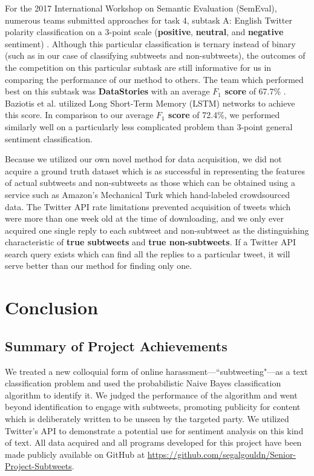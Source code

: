 \documentclass[11pt, twoside, reqno]{book}
\begin{document}
For the 2017 International Workshop on Semantic Evaluation (SemEval), numerous teams submitted approaches for task 4, subtask A: English Twitter polarity classification on a 3-point scale (\textbf{positive}, \textbf{neutral}, and \textbf{negative} sentiment) \cite{semeval_2017}. Although this particular classification is ternary instead of binary (such as in our case of classifying subtweets and non-subtweets), the outcomes of the competition on this particular subtask are still informative for us in comparing the performance of our method to others. The team which performed best on this subtask was \textbf{DataStories} with an average \textbf{$F_{1}$ score} of 67.7\% \cite{semeval_best}. Baziotis et al. utilized Long Short-Term Memory (LSTM) networks to achieve this score. In comparison to our average \textbf{$F_{1}$ score} of 72.4\%, we performed similarly well on a particularly less complicated problem than 3-point general sentiment classification.

Because we utilized our own novel method for data acquisition, we did not acquire a ground truth dataset which is as successful in representing the features of actual subtweets and non-subtweets as those which can be obtained using a service such as Amazon's Mechanical Turk which hand-labeled crowdsourced data. The Twitter API rate limitations prevented acquisition of tweets which were more than one week old at the time of downloading, and we only ever acquired one single reply to each subtweet and non-subtweet as the distinguishing characteristic of \textbf{true subtweets} and \textbf{true non-subtweets}. If a Twitter API search query exists which can find all the replies to a particular tweet, it will serve better than our method for finding only one.

\chapter{Conclusion}
\label{conclusion}

\section{Summary of Project Achievements}
\label{summary}

We treated a new colloquial form of online harassment---``subtweeting"---as a text classification problem and used the probabilistic Naive Bayes classification algorithm to identify it. We judged the performance of the algorithm and went beyond identification to engage with subtweets, promoting publicity for content which is deliberately written to be unseen by the targeted party. We utilized Twitter's API to demonstrate a potential use for sentiment analysis on this kind of text.
\linebreak
\linebreak
\noindent
All data acquired and all programs developed for this project have been made publicly available on GitHub at \url{https://github.com/segalgouldn/Senior-Project-Subtweets}.
\end{document}
